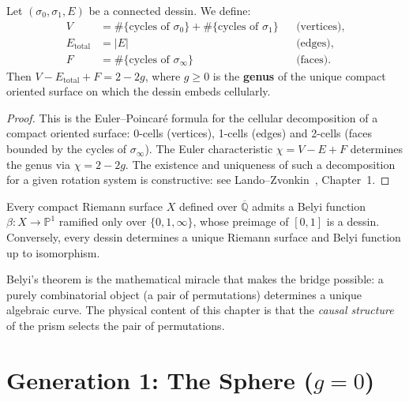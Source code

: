 \begin{theorem}
\label{thm:euler-grothendieck}
Let $(\sigma_0, \sigma_1, E)$ be a connected dessin. We define:
\begin{align*}
  V &= \#\{\text{cycles of } \sigma_0\}
     + \#\{\text{cycles of } \sigma_1\}
     && \text{(vertices)}, \\
  E_{\mathrm{total}} &= |E|
     && \text{(edges)}, \\
  F &= \#\{\text{cycles of } \sigma_\infty\}
     && \text{(faces)}.
\end{align*}
Then $V - E_{\mathrm{total}} + F = 2 - 2g$, where $g \ge 0$ is the
\textbf{genus} of the unique compact oriented surface on which
the dessin embeds cellularly.
\end{theorem}

\begin{proof}
This is the Euler--Poincar\'e formula for the cellular decomposition of a
compact oriented surface: 0-cells (vertices), 1-cells (edges)
and 2-cells (faces bounded by the cycles of $\sigma_\infty$). The
Euler characteristic $\chi = V - E + F$ determines the genus via
$\chi = 2 - 2g$. The existence and uniqueness of such a decomposition for
a given rotation system is constructive: see
Lando--Zvonkin~\cite{lando2004}, Chapter~1.
\end{proof}

\begin{theorem}
\label{thm:belyi}
Every compact Riemann surface $X$ defined over
$\overline{\mathbb{Q}}$ admits a Belyi function
$\beta \colon X \to \mathbb{P}^1$ ramified only over
$\{0, 1, \infty\}$, whose preimage of $[0,1]$ is a dessin.
Conversely, every dessin determines a unique Riemann surface and
Belyi function up to isomorphism.
\end{theorem}

\noindent
Belyi's theorem is the mathematical miracle that makes the bridge possible:
a purely combinatorial object (a pair of permutations) determines a
unique algebraic curve. The physical content of this chapter is that the
\emph{causal structure} of the prism selects the pair of permutations.

\section{Generation 1: The Sphere ($g = 0$)}
\label{sec:gen1-esfera}

